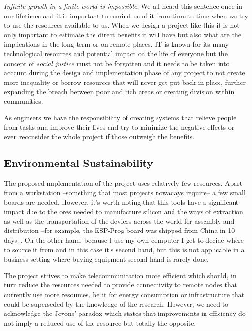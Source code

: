 \textit{Infinite growth in a finite world is impossible}. We all heard this sentence once in our lifetimes and it is important to remind us of it from time to time when we try to use the resources available to us. When we design a project like this it is not only important to estimate the direct benefits it will have but also what are the implications in the long term or on remote places.
IT is known for its many technological resources and potential impact on the life of everyone but the concept of \textit{social justice} must not be forgotten and it needs to be taken into account during the design and implementation phase of any project to not create more inequality or borrow resources that will never get put back in place, further expanding the breach between poor and rich areas or creating division within communities.

As engineers we have the responsibility of creating systems that relieve people from tasks and improve their lives and try to minimize the negative effects or even reconsider the whole project if those outweigh the benefits.

\subsection{Environmental Sustainability}
The proposed implementation of the project uses relatively few resources. Apart from a workstation --something that most projects nowadays require-- a few small boards are needed. However, it's worth noting that this tools have a significant impact due to the ores needed to manufacture silicon and the ways of extraction as well as the transportation of the devices across the world for assembly and distribution --for example, the ESP-Prog board was shipped from China in 10 days--. On the other hand, because I use my own computer I get to decide where to source it from and in this case it's second hand, but this is not applicable in a business setting where buying equipment second hand is rarely done.

The project strives to make telecommunication more efficient which should, in turn reduce the resources needed to provide connectivity to remote nodes that currently use more resources, be it for energy consumption or infrastructure that could be superseded by the knowledge of the research. However, we need to acknowledge the Jevons' paradox\cite{Alcott2005} which states that improvements in efficiency do not imply a reduced use of the resource but totally the opposite.


